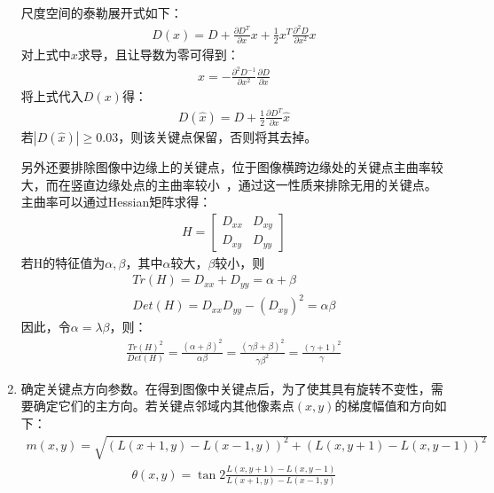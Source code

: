 \begin{enumerate}
  尺度空间的泰勒展开式如下：
  \begin{eqnarray}
  D(x)=D+\frac{\partial D^{T}}{\partial x}x+\frac{1}{2}x^{T}\frac{\partial^{2}D}{\partial x^{2}}x
  \end{eqnarray}
  对上式中$x$求导，且让导数为零可得到：
  \begin{eqnarray}
  \hat{x} = -\frac{\partial^{2}D^{-1}}{\partial x^{2}}\frac{\partial D}{\partial x}
  \end{eqnarray}
  将上式代入$D(x)$得：
  \begin{eqnarray}
  D(\hat{x})=D+\frac{1}{2}\frac{\partial D^{T}}{\partial x}\hat{x}
  \end{eqnarray}
  若$|D(\hat{x})| \ge 0.03$，则该关键点保留，否则将其去掉。

  另外还要排除图像中边缘上的关键点，位于图像横跨边缘处的关键点主曲率较大，而在竖直边缘处点的主曲率较小~\cite{陈健斌2012图像特征提取及其相似度的研究和实现}，通过这一性质来排除无用的关键点。主曲率可以通过Hessian矩阵求得：
  \begin{eqnarray}
  H=\left[ \begin{array}{ll} D_{xx} & D_{xy}\\ D_{xy} & D_{yy} \end{array} \right]
  \end{eqnarray}
  若H的特征值为$\alpha, \beta$，其中$\alpha$较大，$\beta$较小，则
  \begin{eqnarray}
  Tr(H)=D_{xx}+D_{yy}=\alpha + \beta\\
  Det(H)=D_{xx}D_{yy}-(D_{xy})^{2}=\alpha\beta
  \end{eqnarray}
  因此，令$\alpha = \lambda\beta$，则：
  \begin{eqnarray}
  \frac{Tr(H)^{2}}{Det(H)}=\frac{(\alpha+\beta)^{2}}{\alpha\beta}=\frac{(\gamma\beta+\beta)^{2}}{\gamma\beta^{2}}=\frac{(\gamma+1)^{2}}{\gamma}
  \end{eqnarray}

\item 确定关键点方向参数。在得到图像中关键点后，为了使其具有旋转不变性，需要确定它们的主方向。若关键点邻域内其他像素点$(x,y)$的梯度幅值和方向如下：
  \begin{eqnarray}
  m(x,y)=\sqrt{(L(x+1,y)-L(x-1,y))^{2}+(L(x,y+1)-L(x,y-1))^{2}}
  \end{eqnarray}
  \begin{eqnarray}
  \theta(x,y)=\tan 2\frac{L(x,y+1)-L(x,y-1)}{L(x+1,y)-L(x-1,y)}
  \end{eqnarray}


\end{enumerate}
